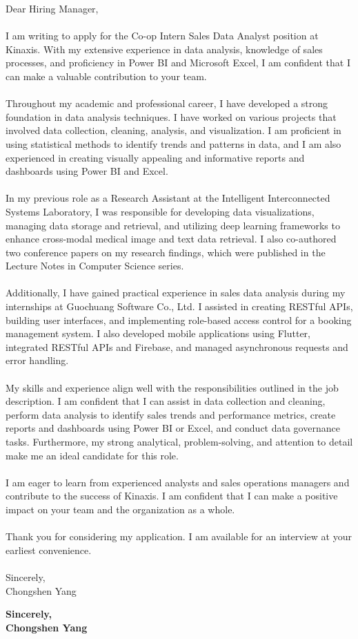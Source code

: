 \documentclass[letterpaper,11pt]{article}
\begin{document}
Dear Hiring Manager, \\  \\ 
I am writing to apply for the Co-op Intern Sales Data Analyst position at Kinaxis. With my extensive experience in data analysis, knowledge of sales processes, and proficiency in Power BI and Microsoft Excel, I am confident that I can make a valuable contribution to your team. \\  \\ 
Throughout my academic and professional career, I have developed a strong foundation in data analysis techniques. I have worked on various projects that involved data collection, cleaning, analysis, and visualization. I am proficient in using statistical methods to identify trends and patterns in data, and I am also experienced in creating visually appealing and informative reports and dashboards using Power BI and Excel. \\  \\ 
In my previous role as a Research Assistant at the Intelligent Interconnected Systems Laboratory, I was responsible for developing data visualizations, managing data storage and retrieval, and utilizing deep learning frameworks to enhance cross-modal medical image and text data retrieval. I also co-authored two conference papers on my research findings, which were published in the Lecture Notes in Computer Science series. \\  \\ 
Additionally, I have gained practical experience in sales data analysis during my internships at Guochuang Software Co., Ltd. I assisted in creating RESTful APIs, building user interfaces, and implementing role-based access control for a booking management system. I also developed mobile applications using Flutter, integrated RESTful APIs and Firebase, and managed asynchronous requests and error handling. \\  \\ 
My skills and experience align well with the responsibilities outlined in the job description. I am confident that I can assist in data collection and cleaning, perform data analysis to identify sales trends and performance metrics, create reports and dashboards using Power BI or Excel, and conduct data governance tasks. Furthermore, my strong analytical, problem-solving, and attention to detail make me an ideal candidate for this role. \\  \\ 
I am eager to learn from experienced analysts and sales operations managers and contribute to the success of Kinaxis. I am confident that I can make a positive impact on your team and the organization as a whole. \\  \\ 
Thank you for considering my application. I am available for an interview at your earliest convenience. \\  \\ 
Sincerely, \\ 
Chongshen Yang

\vspace{1cm}

\textbf{Sincerely,} \\
\textbf{Chongshen Yang}
\end{document}
